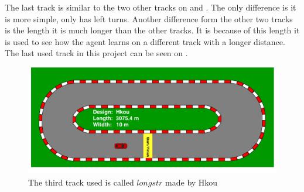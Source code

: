 The last track is similar to the two other tracks on  and . The only difference is it is more simple, only has left turns. Another difference form the other two tracks is the length it is much longer than the other tracks. It is because of this length it is used to see how the agent learns on a different track with a longer distance. The last used track in this project can be seen on . 

\begin{figure}[H]
	\centering
	\includegraphics[width=1\textwidth]{Figures/Result/track_longstr.pdf}
	\caption{The third track used is called $longstr$ made by Hkou}
	\label{fig:track_longstr}
\end{figure}


